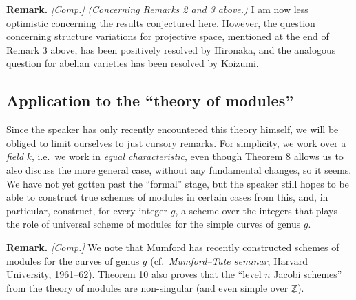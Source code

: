 \documentclass{article}
\newenvironment{rmenv}[1]
  {\phantomsection\par\smallskip\noindent\textbf{#1.}\rmfamily}
  {\par\smallskip}
\newcommand{\oldpage}[1]{\marginpar{\footnotesize$\Big\vert$ \textit{p.~#1}}}
\theoremstyle{definition}
\theoremstyle{definition}
\theoremstyle{definition}
\theoremstyle{definition}
\theoremstyle{remark}
\begin{document}
\begin{rmenv}{Remark}
\emph{{[}Comp.{]}}
\emph{(Concerning Remarks 2 and 3 above.)}
I am now less optimistic concerning the results conjectured here.
However, the question concerning structure variations for projective space, mentioned at the end of Remark 3 above, has been positively resolved by Hironaka, and the analogous question for abelian varieties has been resolved by Koizumi.

\end{rmenv}

\hypertarget{fga-2-section-7}{%
\subsection{Application to the ``theory of modules''}\label{fga-2-section-7}}

Since the speaker has only recently encountered this theory himself, we will be obliged to limit ourselves to just cursory remarks.
For simplicity, we work over a \emph{field} \(k\), i.e.~we work in \emph{equal characteristic}, even though \protect\hyperlink{fga-2-theorem-8}{Theorem 8} allows us to also discuss the more general case, without any fundamental changes, so it seems.
We have not yet gotten past the ``formal'' stage, but the speaker still hopes to be able to construct true schemes of modules in certain cases from this, and, in particular, construct, for every integer \(g\), a scheme over the integers that plays the role of universal scheme of modules for the simple curves of genus \(g\).

\begin{rmenv}{Remark}
\emph{{[}Comp.{]}}
\oldpage{182-16}We note that Mumford has recently constructed schemes of modules for the curves of genus \(g\) (cf.~\emph{Mumford--Tate seminar}, Harvard University, 1961--62).
\protect\hyperlink{fga-2-theorem-10}{Theorem 10} also proves that the ``level \(n\) Jacobi schemes'' from the theory of modules are non-singular (and even simple over \(\underline{\mathbb{Z}}\)).

\end{rmenv}
\end{document}
